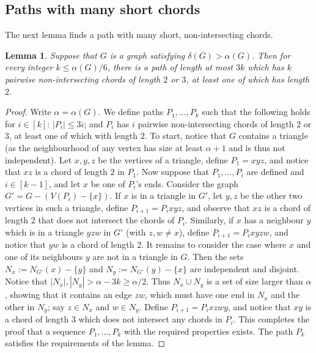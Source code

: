\documentclass[11pt,english]{article}
\theoremstyle{plain}
\newtheorem{lemma}[theorem]{Lemma}
\theoremstyle{definition}
\theoremstyle{remark}
\begin{document}
\subsection{Paths with many short chords}
	The next lemma finds a path with many short, non-intersecting chords.

	\begin{lemma} \label{lem:path-chords}
		Suppose that $G$ is a graph satisfying $\delta(G) > \alpha(G)$.
		Then for every integer $k \le \alpha(G)/6$, there is a path of length at most $3k$ which has $k$ pairwise non-intersecting chords of length $2$ or $3$, at least one of which has length $2$.
	\end{lemma}

	\begin{proof}
		Write $\alpha = \alpha(G)$.
		We define paths $P_1, \ldots, P_k$ such that the following holds for $i \in [k]$: $|P_i| \le 3i$; and $P_i$ has $i$ pairwise non-intersecting chords of length $2$ or $3$, at least one of which with length $2$.
		To start, notice that $G$ contains a triangle (as the neighbourhood of any vertex has size at least $\alpha + 1$ and is thus not independent). Let $x,y,z$ be the vertices of a triangle, define $P_1 = xyz$, and notice that $xz$ is a chord of length $2$ in $P_1$. 
		Now suppose that $P_1, \ldots, P_i$ are defined and $i \in [k-1]$, and let $x$ be one of $P_i$'s ends. Consider the graph $G' = G - (V(P_i) - \{x\})$. If $x$ is in a triangle in $G'$, let $y, z$ be the other two vertices in such a triangle, define $P_{i+1} = P_i xyz$, and observe that $xz$ is a chord of length $2$ that does not intersect the chords of $P_i$.
		Similarly, if $x$ has a neighbour $y$ which is in a triangle $yzw$ in $G'$ (with $z,w \neq x$), define $P_{i+1} = P_i xyzw$, and notice that $yw$ is a chord of length $2$.
		It remains to consider the case where $x$ and one of its neighbours $y$ are not in a triangle in $G$. Then the sets $N_x := N_{G'}(x) - \{y\}$ and $N_y := N_{G'}(y) - \{x\}$ are independent and disjoint. Notice that $|N_x|, |N_y| > \alpha - 3k \ge \alpha/2$. Thus $N_x \cup N_y$ is a set of size larger than $\alpha$, showing that it contains an edge $zw$, which must have one end in $N_x$ and the other in $N_y$; say $z \in N_x$ and $w \in N_y$. Define $P_{i+1} = P_i xzwy$, and notice that $xy$ is a chord of length $3$ which does not intersect any chords in $P_i$.
		This completes the proof that a sequence $P_1, \ldots, P_k$ with the required properties exists.
		The path $P_k$ satisfies the requirements of the lemma.
	\end{proof}
\end{document}
